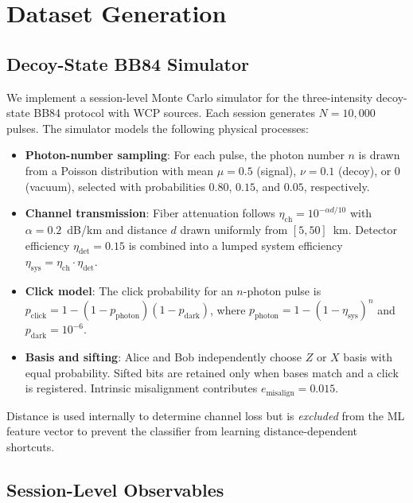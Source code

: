 \documentclass[conference]{IEEEtran}
\begin{document}
\section{Dataset Generation}

\subsection{Decoy-State BB84 Simulator}

We implement a session-level Monte Carlo simulator for the three-intensity decoy-state BB84 protocol with WCP sources. Each session generates $N = 10{,}000$ pulses. The simulator models the following physical processes:

\begin{itemize}
    \item \textbf{Photon-number sampling}: For each pulse, the photon number $n$ is drawn from a Poisson distribution with mean $\mu = 0.5$ (signal), $\nu = 0.1$ (decoy), or $0$ (vacuum), selected with probabilities $0.80$, $0.15$, and $0.05$, respectively.
    \item \textbf{Channel transmission}: Fiber attenuation follows $\eta_{\mathrm{ch}} = 10^{-\alpha d / 10}$ with $\alpha = 0.2$~dB/km and distance $d$ drawn uniformly from $[5, 50]$~km. Detector efficiency $\eta_{\mathrm{det}} = 0.15$ is combined into a lumped system efficiency $\eta_{\mathrm{sys}} = \eta_{\mathrm{ch}} \cdot \eta_{\mathrm{det}}$.
    \item \textbf{Click model}: The click probability for an $n$-photon pulse is $p_{\mathrm{click}} = 1 - (1 - p_{\mathrm{photon}})(1 - p_{\mathrm{dark}})$, where $p_{\mathrm{photon}} = 1 - (1 - \eta_{\mathrm{sys}})^n$ and $p_{\mathrm{dark}} = 10^{-6}$.
    \item \textbf{Basis and sifting}: Alice and Bob independently choose $Z$ or $X$ basis with equal probability. Sifted bits are retained only when bases match and a click is registered. Intrinsic misalignment contributes $e_{\mathrm{misalign}} = 0.015$.
\end{itemize}

Distance is used internally to determine channel loss but is \emph{excluded} from the ML feature vector to prevent the classifier from learning distance-dependent shortcuts.

\subsection{Session-Level Observables}
\end{document}
